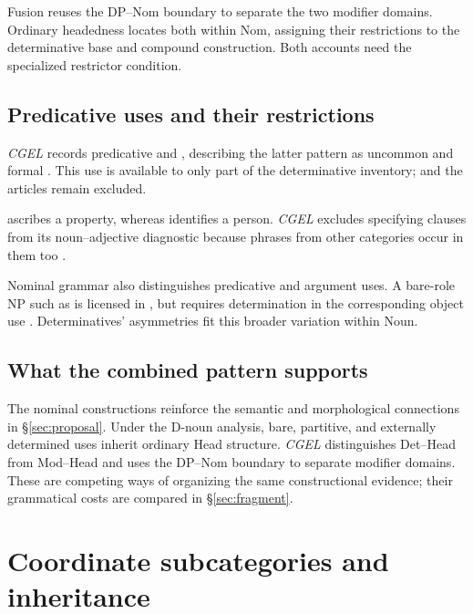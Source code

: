 \documentclass[12pt]{article}
\begin{document}
Fusion reuses the DP--Nom boundary to separate the two modifier domains. Ordinary headedness locates both within Nom, assigning their restrictions to the determinative base and compound construction. Both accounts need the specialized restrictor condition.

\subsection{Predicative uses and their restrictions}\label{sec:predication}

\textit{CGEL} records predicative  and , describing the latter pattern as uncommon and formal \citep[392, 395--396]{huddleston2002}. This use is available to only part of the determinative inventory;  and the articles remain excluded.

 ascribes a property, whereas  identifies a person. \textit{CGEL} excludes specifying  clauses from its noun--adjective diagnostic because phrases from other categories occur in them too \citep[536]{huddleston2002}.

Nominal grammar also distinguishes predicative and argument uses. A bare-role NP such as  is licensed in , but requires determination in the corresponding object use  \citep[328]{huddleston2002}. Determinatives' asymmetries fit this broader variation within Noun.

\subsection{What the combined pattern supports}\label{sec:cumulative}

The nominal constructions reinforce the semantic and morphological connections in §\ref{sec:proposal}. Under the D-noun analysis, bare, partitive, and externally determined uses inherit ordinary Head structure. \textit{CGEL} distinguishes Det--Head from Mod--Head and uses the DP--Nom boundary to separate modifier domains. These are competing ways of organizing the same constructional evidence; their grammatical costs are compared in §\ref{sec:fragment}.

\section{Coordinate subcategories and inheritance}\label{sec:inheritance}
\end{document}
